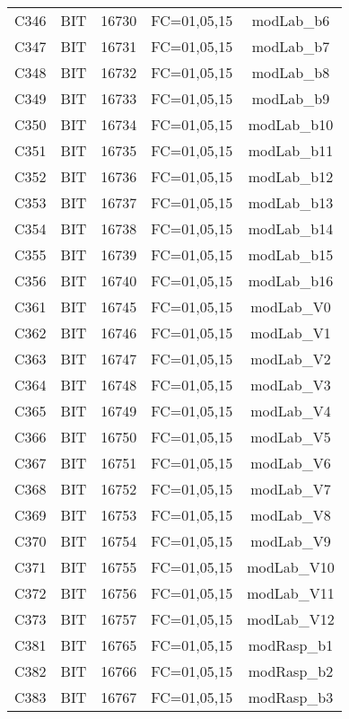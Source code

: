 \begin{center}
\begin{longtable}[c]{ |c|c|c|c|c| }
        C346	&	BIT	&	16730	&	FC=01,05,15	&	modLab\_b6\\
        C347	&	BIT	&	16731	&	FC=01,05,15	&	modLab\_b7\\
        C348	&	BIT	&	16732	&	FC=01,05,15	&	modLab\_b8\\
        C349	&	BIT	&	16733	&	FC=01,05,15	&	modLab\_b9\\
        C350	&	BIT	&	16734	&	FC=01,05,15	&	modLab\_b10\\
        C351	&	BIT	&	16735	&	FC=01,05,15	&	modLab\_b11\\
        C352	&	BIT	&	16736	&	FC=01,05,15	&	modLab\_b12\\
        C353	&	BIT	&	16737	&	FC=01,05,15	&	modLab\_b13\\
        C354	&	BIT	&	16738	&	FC=01,05,15	&	modLab\_b14\\
        C355	&	BIT	&	16739	&	FC=01,05,15	&	modLab\_b15\\
        C356	&	BIT	&	16740	&	FC=01,05,15	&	modLab\_b16\\
        C361	&	BIT	&	16745	&	FC=01,05,15	&	modLab\_V0\\
        C362	&	BIT	&	16746	&	FC=01,05,15	&	modLab\_V1\\
        C363	&	BIT	&	16747	&	FC=01,05,15	&	modLab\_V2\\
        C364	&	BIT	&	16748	&	FC=01,05,15	&	modLab\_V3\\
        C365	&	BIT	&	16749	&	FC=01,05,15	&	modLab\_V4\\
        C366	&	BIT	&	16750	&	FC=01,05,15	&	modLab\_V5\\
        C367	&	BIT	&	16751	&	FC=01,05,15	&	modLab\_V6\\
        C368	&	BIT	&	16752	&	FC=01,05,15	&	modLab\_V7\\
        C369	&	BIT	&	16753	&	FC=01,05,15	&	modLab\_V8\\
        C370	&	BIT	&	16754	&	FC=01,05,15	&	modLab\_V9\\
        C371	&	BIT	&	16755	&	FC=01,05,15	&	modLab\_V10\\
        C372	&	BIT	&	16756	&	FC=01,05,15	&	modLab\_V11\\
        C373	&	BIT	&	16757	&	FC=01,05,15	&	modLab\_V12\\
        C381	&	BIT	&	16765	&	FC=01,05,15	&	modRasp\_b1\\
        C382	&	BIT	&	16766	&	FC=01,05,15	&	modRasp\_b2\\
        C383	&	BIT	&	16767	&	FC=01,05,15	&	modRasp\_b3\\

\end{longtable}
\end{center}
